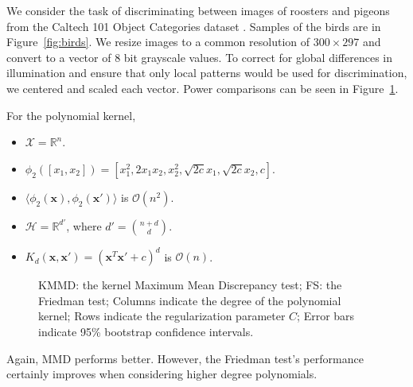 We consider the task of discriminating between images of roosters and
pigeons from the Caltech 101 Object Categories dataset
\cite{fei2007learning}.  Samples of the birds are in Figure~\ref{fig:birds}.
We resize images to a common resolution of $300 \times
297$ and convert to a vector of 8 bit grayscale values.
To correct for global differences in illumination and ensure
that only local patterns would be used for discrimination, we centered and
scaled each vector.  Power comparisons can be seen in Figure~\ref{fig:power_birds}.

For the polynomial kernel,
\begin{itemize}
\item $\mathcal{X} = \mathbb{R}^{n}$.
\item $\phi_2 ([x_1, x_2]) = [x_1^2,  2x_1x_2,  x_2^2, \sqrt{2c}x_1, \sqrt{2c}x_2, c]$.
\item $\langle \phi_2({\mathbf x}), \phi_2({\mathbf x}') \rangle$ is $\mathcal{O}(n^2)$.
\item $\mathcal{H} = \mathbb{R}^{d'}$, where $d' = \binom{n+d}{d}$.
\item $K_d({\mathbf x},{\mathbf x}') = ({\mathbf x}^T {\mathbf x}'  + c)^d$ is $\mathcal{O}(n)$.
\end{itemize}

\begin{figure}
  \begin{center}
    \resizebox{14.0cm}{!}{
      
    }
  \end{center}
  \caption{KMMD: the kernel Maximum Mean Discrepancy test; FS: the
    Friedman test; Columns indicate the degree of the polynomial
    kernel; Rows indicate the regularization parameter $C$; Error bars indicate
    95\% bootstrap confidence intervals.}
  \label{fig:power_birds}
\end{figure}

Again, MMD performs better.  However, the Friedman test's performance
certainly improves when considering higher degree polynomials.


